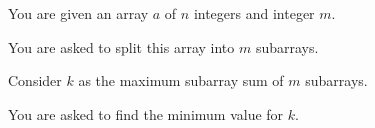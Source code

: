 You are given an array $a$ of $n$ integers and integer $m$.

You are asked to split this array into $m$ subarrays.

Consider $k$ as the maximum subarray sum of $m$ subarrays.

You are asked to find the minimum value for $k$.
